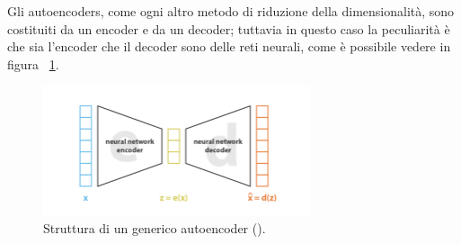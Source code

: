 \label{autoencoders}
Gli autoencoders, come ogni altro metodo di riduzione della dimensionalità, sono costituiti da un encoder e da un decoder; tuttavia in questo caso la peculiarità è che sia l'encoder che il decoder sono delle reti neurali, come è possibile vedere in figura ~\ref{autoencoder}. 

\begin{figure}[h!]
	\centering
	\includegraphics[width=0.70\textwidth]{figs/autoencoder.png}
	\caption{Struttura di un generico autoencoder (\cite{Understanding_VAEs}).}
	\label{autoencoder}
\end{figure}

